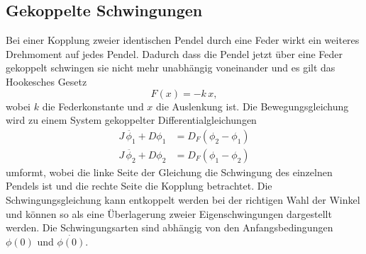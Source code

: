 \subsection{Gekoppelte Schwingungen} %
\label{subsec:Schwingungen}
 Bei einer Kopplung zweier identischen Pendel durch eine Feder wirkt ein weiteres Drehmoment auf jedes Pendel.
 Dadurch dass die Pendel jetzt über eine Feder gekoppelt schwingen sie nicht mehr unabhängig voneinander und es gilt das Hookesches Gesetz
 \begin{equation*}
     F(x) = -k \, x ,
 \end{equation*}
 wobei $k$ die Federkonstante und $x$ die Auslenkung ist.
 Die Bewegungsgleichung wird zu einem System gekoppelter Differentialgleichungen
 \begin{align}
     J \, \ddot{\phi_1} + D \phi_1 &= D_F (\phi_2 - \phi_1) \\
     J \, \ddot{\phi_2} + D \phi_2 &= D_F (\phi_1 - \phi_2)
 \end{align}
 umformt, wobei die linke Seite der Gleichung die Schwingung des einzelnen Pendels ist und die rechte Seite die Kopplung betrachtet.
 Die Schwingungsgleichung kann entkoppelt werden bei der richtigen Wahl der Winkel und können so als eine Überlagerung zweier Eigenschwingungen dargestellt werden.
 Die Schwingungsarten sind abhängig von den Anfangsbedingungen $\phi(0)$ und $\dot{\phi(0)}$. 

